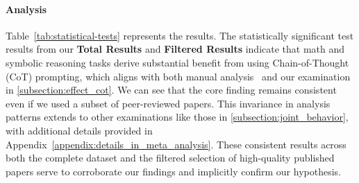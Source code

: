 \paragraph{Analysis} 

Table~\ref{tab:statistical-tests} represents the results.
The statistically significant test results from our \textbf{Total Results} and \textbf{Filtered Results} indicate that math and symbolic reasoning tasks derive substantial benefit from using Chain-of-Thought (CoT) prompting, which aligns with both manual analysis~\citep{sprague2024cot} and our examination in \cref{subsection:effect_cot}.
We can see that the core finding remains consistent even if we used a subset of peer-reviewed papers.
This invariance in analysis patterns extends to other examinations like those in \cref{subsection:joint_behavior}, with additional details provided in Appendix~\ref{appendix:details_in_meta_analysis}.
These consistent results across both the complete dataset and the filtered selection of high-quality published papers serve to corroborate our findings and implicitly confirm our hypothesis.


